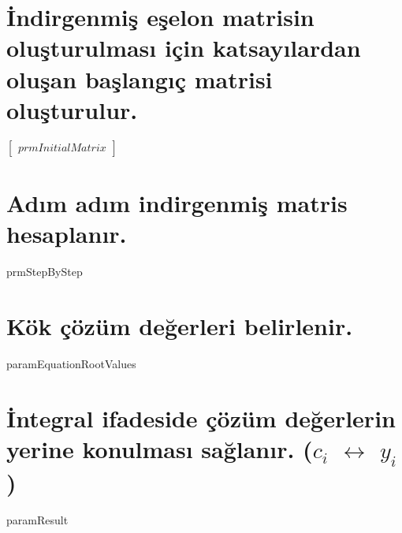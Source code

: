 \documentclass{article}
\begin{document}
\section{İndirgenmiş eşelon matrisin oluşturulması için katsayılardan oluşan başlangıç matrisi oluşturulur.}
\begin{center}
$\begin{bmatrix}
prmInitialMatrix
\end{bmatrix} $
\end{center}

\section{Adım adım indirgenmiş matris hesaplanır.}
\begin{center}
prmStepByStep
\end{center}

\section{Kök çözüm değerleri belirlenir.}
paramEquationRootValues

\section{İntegral ifadeside çözüm değerlerin yerine konulması sağlanır. ($c_{i}$ $\leftrightarrow$ $y_{i}$)}
paramResult
\end{document}
